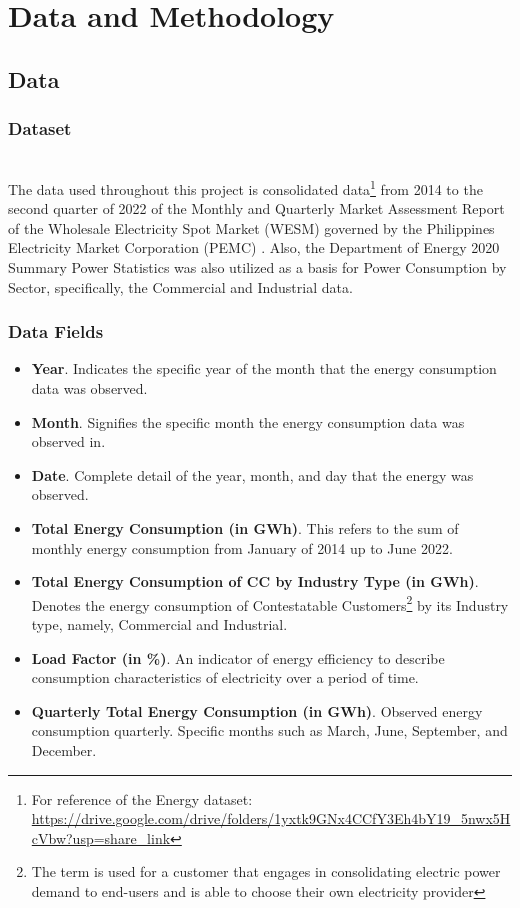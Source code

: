 \documentclass[runningheads]{llncs}
\begin{document}
\section{Data and Methodology}
\subsection{Data}

\subsubsection{Dataset}~\\

The data used throughout this project is consolidated data\footnote{For reference of the Energy dataset:\\ 
\url{https://drive.google.com/drive/folders/1yxtk9GNx4CCfY3Eh4bY19\_5nwx5HcVbw?usp=share\_link}} from 2014 to the second quarter of 2022 of the Monthly and Quarterly Market Assessment Report of the Wholesale Electricity Spot Market (WESM) governed by the Philippines Electricity Market Corporation (PEMC) \cite{pemc}. Also, the Department of Energy 2020 Summary Power Statistics was also utilized as a basis for Power Consumption by Sector, specifically, the Commercial and Industrial data.

\subsubsection{Data Fields}
\begin{itemize}
    \item \textbf{Year}. Indicates the specific year of the month that the energy consumption data was observed.
    \item \textbf{Month}. Signifies the specific month the energy consumption data was observed in.
    \item \textbf{Date}. Complete detail of the year, month, and day that the energy was observed.
    \item \textbf{Total Energy Consumption (in GWh)}. This refers to the sum of monthly energy consumption from January of 2014 up to June 2022. 
    \item \textbf{Total Energy Consumption of CC by Industry Type (in GWh)}. Denotes the energy consumption of Contestatable Customers\footnote{The term is used for a customer that engages in consolidating electric power demand to end-users and is able to choose their own electricity provider} by its Industry type, namely, Commercial and Industrial.
    \item \textbf{Load Factor (in \%)}. An indicator of energy efficiency to describe consumption characteristics of electricity over a period of time.
    \item \textbf{Quarterly Total Energy Consumption (in GWh)}. Observed energy consumption quarterly. Specific months such as March, June, September, and December.  
\end{itemize}
\end{document}
